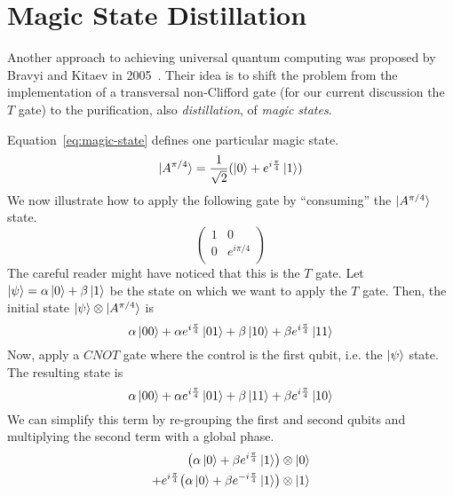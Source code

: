 \section{Magic State Distillation}\label{sec:magic-states}

Another approach to achieving universal quantum computing was proposed by Bravyi and Kitaev in 2005~\cite{bravyi_universal_2005}. Their idea is to shift the problem from the implementation of a transversal non-Clifford gate (for our current discussion the $T$ gate) to the purification, also \textit{distillation}, of \textit{magic states}.

\smallskip
\noindent
Equation~\ref{eq:magic-state} defines one particular magic state.
\begin{equation}\label{eq:magic-state}
    \ket{A^{\pi/4}} = \frac{1}{\sqrt{2}}(\ket0 + e^{i\frac{\pi}{4}}\ket1)
\end{equation}
We now illustrate how to apply the following gate by ``consuming'' the $\ket{A^{\pi/4}}$ state. 
\begin{equation}
    \begin{pmatrix}
        1 & 0 \\
        0 & e^{i\pi{}/4} \\
    \end{pmatrix}
\end{equation}
The careful reader might have noticed that this is the $T$ gate. Let $\ket{\psi} = \alpha\ket0 + \beta\ket1$ be the state on which we want to apply the $T$ gate. Then, the initial state $\ket{\psi} \otimes \ket{A^{\pi/4}}$ is 
\begin{equation}
    \alpha\ket{00} + \alpha{}e^{i\frac{\pi}{4}}\ket{01} + \beta\ket{10} + \beta{}e^{i\frac{\pi}{4}}\ket{11}
\end{equation}
Now, apply a $CNOT$ gate where the control is the first qubit, i.e. the $\ket{\psi}$ state. The resulting state is
\begin{equation}
    \alpha\ket{00} + \alpha{}e^{i\frac{\pi}{4}}\ket{01} +  \beta\ket{11} + \beta{}e^{i\frac{\pi}{4}}\ket{10}
\end{equation}
We can simplify this term by re-grouping the first and second qubits and multiplying the second term with a global phase.
\begin{equation}
    \begin{aligned}
        \bigl(\alpha\ket0 + \beta{}e^{i\frac{\pi}{4}}\ket1\bigr) \otimes \ket0\\
        + e^{i\frac{\pi}{4}}\bigl(\alpha\ket0 + \beta{}e^{-i\frac{\pi}{4}}\ket1\bigr) \otimes \ket1
    \end{aligned}
\end{equation}
